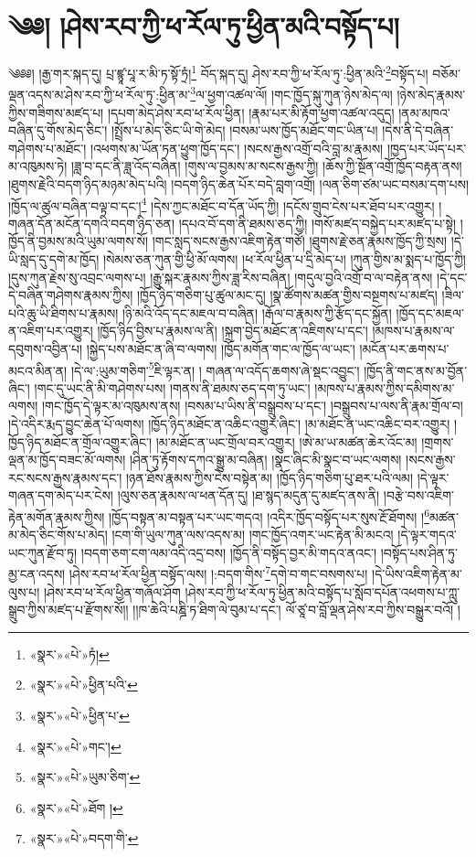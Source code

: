 \chapter{༄༅། །ཤེས་རབ་ཀྱི་ཕ་རོལ་ཏུ་ཕྱིན་མའི་བསྟོད་པ།}༄༅༅། །རྒྱ་གར་སྐད་དུ། པྲ་ཛྙཱ་པཱ་ར་མི་ཏ་སྟོ་ཏྲཾ།\footnote{«སྣར་»«པེ་»ཏཾ།} བོད་སྐད་དུ། ཤེས་རབ་ཀྱི་ཕ་རོལ་ཏུ་:ཕྱིན་མའི་\footnote{«སྣར་»«པེ་»ཕྱིན་པའི་}བསྟོད་པ། བཅོམ་ལྡན་འདས་མ་ཤེས་རབ་ཀྱི་ཕ་རོལ་ཏུ་:ཕྱིན་མ་\footnote{«སྣར་»«པེ་»ཕྱིན་པ་}ལ་ཕྱག་འཚལ་ལོ། །གང་ཁྱོད་སྐུ་ཀུན་ཉེས་མེད་ལ། །ཉེས་མེད་རྣམས་ཀྱིས་གཟིགས་མཛད་པ། །དཔག་མེད་ཤེས་རབ་ཕ་རོལ་ཕྱིན། །རྣམ་པར་མི་རྟོག་ཕྱག་འཚལ་འདུད། །ནམ་མཁའ་བཞིན་དུ་གོས་མེད་ཅིང་། །སྤྲོས་པ་མེད་ཅིང་ཡི་གེ་མེད། །བསམ་ཡས་ཁྱོད་མཐོང་གང་ཡིན་པ། །དེས་ནི་དེ་བཞིན་གཤེགས་པ་མཐོང་། །འཕགས་མ་ཡོན་ཏན་ཕྱུག་ཁྱོད་དང་། །སངས་རྒྱས་འགྲོ་བའི་བླ་མ་རྣམས། །ཁྱད་པར་ཡོད་པར་མ་འཁུམས་ཏེ། །ཟླ་བ་དང་ནི་ཟླ་འོད་བཞིན། །གུས་ལ་བྱམས་མ་སངས་རྒྱས་ཀྱི། །ཆོས་ཀྱི་སྔོན་འགྲོ་ཁྱོད་བརྟན་ནས། །ཐུགས་རྗེའི་བདག་ཉིད་མཉམ་མེད་པའི། །བདག་ཉིད་ཆེན་པོར་བདེ་བླག་འགྲོ། །ལན་ཅིག་ཙམ་ཡང་བསམ་དག་པས། །ཁྱོད་ལ་ཚུལ་བཞིན་བལྟ་བ་དང་།\footnote{«སྣར་»«པེ་»གང་།} །དེས་ཀྱང་མཐོང་བ་དོན་ཡོད་ཀྱི། །དངོས་གྲུབ་ངེས་པར་ཐོབ་པར་འགྱུར། །གཞན་དོན་མངོན་དགའི་བདག་ཉིད་ཅན། །དཔའ་བོ་དག་ནི་ཐམས་ཅད་ཀྱི། །གསོ་མཛད་བསྐྱེད་པར་མཛད་པ་སྟེ། །ཁྱོད་ནི་བྱམས་མའི་ཡུམ་ལགས་སོ། །གང་སླད་སངས་རྒྱས་འཇིག་རྟེན་གཙོ། །ཐུགས་རྗེ་ཅན་རྣམས་ཁྱོད་ཀྱི་སྲས། །དེ་ཡི་སླད་དུ་དགེ་མ་ཁྱོད། །སེམས་ཅན་ཀུན་གྱི་ཕྱི་མོ་ལགས། །ཕ་རོལ་ཕྱིན་པ་དྲི་མེད་པ། །ཀུན་གྱིས་མ་སྨད་པ་ཁྱོད་ཀྱི། །དུས་ཀུན་རྗེས་སུ་འབྲང་ལགས་པ། །རྒྱུ་སྐར་རྣམས་ཀྱིས་ཟླ་རིས་བཞིན། །གདུལ་བྱའི་འགྲོ་བ་ལ་བརྟེན་ནས། །དེ་དང་དེ་བཞིན་གཤེགས་རྣམས་ཀྱིས། །ཁྱོད་ཉིད་གཅིག་པུ་ཚུལ་མང་དུ། །སྣ་ཚོགས་མཚན་གྱིས་བསྔགས་པ་མཛད། །ཟིལ་པའི་ཆུ་ཡི་ཐིགས་པ་རྣམས། །ཉི་མའི་འོད་དང་མཇལ་བ་བཞིན། །རྒོལ་བ་རྣམས་ཀྱི་རྩོད་དང་སྐྱོན། །ཁྱོད་དང་མཇལ་ན་འཇིག་པར་འགྱུར། །ཁྱོད་ཉིད་བྱིས་པ་རྣམས་ལ་ནི། །སྐྲག་བྱེད་མཐོང་ན་འཇིགས་པ་དང་། །མཁས་པ་རྣམས་ལ་དབུགས་འབྱིན་པ། །སྐྱེད་པས་མཐོང་ན་ཞི་བ་ལགས། །ཁྱོད་མགོན་གང་ལ་ཁྱོད་ལ་ཡང་། །མངོན་པར་ཆགས་པ་མངའ་མིན་ན། །དེ་ལ་:ཡུམ་གཅིག་\footnote{«སྣར་»«པེ་»ཡུམ་ཅིག་}ཇི་ལྟར་ན། །
གཞན་ལ་འདོད་ཆགས་ཞེ་སྡང་འབྱུང་། །ཁྱོད་ནི་གང་ནས་མ་བྱོན་ཞིང་། །གང་དུ་ཡང་ནི་མི་གཤེགས་པས། །གནས་ནི་ཐམས་ཅད་དག་ཏུ་ཡང་། །མཁས་པ་རྣམས་ཀྱིས་དམིགས་མ་ལགས། །གང་ཁྱོད་དེ་ལྟར་མ་འཁུམས་ནས། །བསམ་པ་ཡིས་ནི་བསྒྲུབས་པ་དང་། །བསྒྲུབས་པ་ལས་ནི་རྣམ་གྲོལ་བ། །དེ་འདིར་རྨད་བྱུང་ཆེན་པོ་ལགས། །ཁྱོད་ཉིད་མཐོང་ན་འཆིང་འགྱུར་ཞིང་། །མ་མཐོང་ན་ཡང་འཆིང་བར་འགྱུར། །ཁྱོད་ཉིད་མཐོང་ན་གྲོལ་འགྱུར་ཞིང་། །མ་མཐོང་ན་ཡང་གྲོལ་བར་འགྱུར། །ཨེ་མ་ཡ་མཚན་ཆེར་འོང་མ། །གྲགས་ལྡན་མ་ཁྱོད་བཟང་མོ་ལགས། །ཤིན་ཏུ་རྟོགས་དཀའ་སྒྱུ་མ་བཞིན། །སྣང་ཞིང་མི་སྣང་བ་ཡང་ལགས། །སངས་རྒྱས་རང་སངས་རྒྱས་རྣམས་དང་། །ཉན་ཐོས་རྣམས་ཀྱིས་ངེས་བསྟེན་མ། །ཁྱོད་ཉིད་གཅིག་པུ་ཐར་པའི་ལམ། །དེ་ལྟར་གཞན་དག་མེད་པར་ངེས། །ལུས་ཅན་རྣམས་ལ་ཕན་དོན་དུ། །ཐ་སྙད་མདུན་དུ་མཛད་ནས་ནི། །བརྩེ་བས་འཇིག་རྟེན་མགོན་རྣམས་ཀྱིས། །ཁྱོད་བསྟན་མ་བསྟན་པར་ཡང་གདའ། །འདིར་ཁྱོད་བསྟོད་པར་སུས་རྔོ་ཐོགས། །\footnote{«སྣར་»«པེ་»ཐོག །}མཚན་མ་མེད་ཅིང་གོས་པ་མེད། །ངག་གི་ཡུལ་ཀུན་ལས་འདས་མ། །གང་ཁྱོད་འགར་ཡང་རྟེན་མི་མངའ། །དེ་ལྟར་གདའ་ཡང་ཀུན་རྫོབ་ཏུ། །བདག་ཅག་ངག་ལམ་འདི་འདྲ་བས། །ཁྱོད་ནི་བསྟོད་བྱར་མི་གདའ་ནའང་། །བསྟོད་པས་ཤིན་ཏུ་མྱ་ངན་འདས། །ཤེས་རབ་ཕ་རོལ་ཕྱིན་བསྟོད་ལས། །:བདག་གིས་\footnote{«སྣར་»«པེ་»བདག་གི་}དགེ་བ་གང་བསགས་པ། །དེ་ཡིས་འཇིག་རྟེན་མ་ལུས་པ། །ཤེས་རབ་ཕ་རོལ་ཕྱིན་གཞོལ་ཤོག །ཤེས་རབ་ཀྱི་ཕ་རོལ་ཏུ་ཕྱིན་མའི་བསྟོད་པ་སློབ་དཔོན་འཕགས་པ་ཀླུ་སྒྲུབ་ཀྱིས་མཛད་པ་རྫོགས་སོ།། །།ཁ་ཆེའི་པཎྜི་ཏ་ཐིག་ལེ་བུམ་པ་དང་། ལོ་ཙཱ་བ་བློ་ལྡན་ཤེས་རབ་ཀྱིས་བསྒྱུར་བའོ། ། 